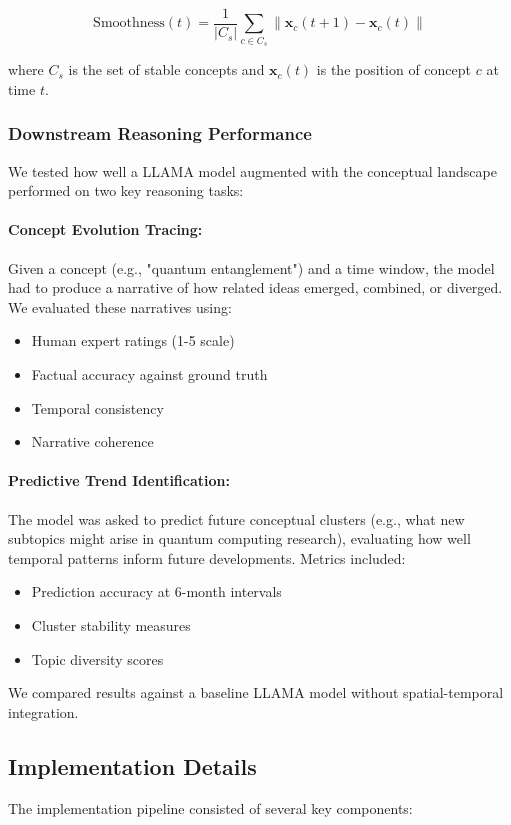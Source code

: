 \documentclass{article}
\begin{document}
\begin{equation}
\text{Smoothness}(t) = \frac{1}{|C_s|} \sum_{c \in C_s} \|\mathbf{x}_c(t+1) - \mathbf{x}_c(t)\|
\end{equation}

where $C_s$ is the set of stable concepts and $\mathbf{x}_c(t)$ is the position of concept $c$ at time $t$.

\subsubsection{Downstream Reasoning Performance}
We tested how well a LLAMA model augmented with the conceptual landscape performed on two key reasoning tasks:

\paragraph{Concept Evolution Tracing:}
Given a concept (e.g., "quantum entanglement") and a time window, the model had to produce a narrative of how related ideas emerged, combined, or diverged. We evaluated these narratives using:
\begin{itemize}
    \item Human expert ratings (1-5 scale)
    \item Factual accuracy against ground truth
    \item Temporal consistency
    \item Narrative coherence
\end{itemize}

\paragraph{Predictive Trend Identification:}
The model was asked to predict future conceptual clusters (e.g., what new subtopics might arise in quantum computing research), evaluating how well temporal patterns inform future developments. Metrics included:
\begin{itemize}
    \item Prediction accuracy at 6-month intervals
    \item Cluster stability measures
    \item Topic diversity scores
\end{itemize}

We compared results against a baseline LLAMA model without spatial-temporal integration.

\subsection{Implementation Details}
The implementation pipeline consisted of several key components:
\end{document}
